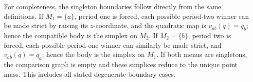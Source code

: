 For completeness, the singleton boundaries follow directly from the same definitions.  If \(M_1=\{a\}\), period one is forced, each possible period-two winner can be made strict by raising its \(z\)-coordinate, and the quadratic map is \(v_{ab}(q)=q_b\); hence the compatible body is the simplex on \(M_2\).  If \(M_2=\{b\}\), period two is forced, each possible period-one winner can similarly be made strict, and \(v_{ab}(q)=q_a\); hence the body is the simplex on \(M_1\).  If both menus are singletons, the comparison graph is empty and these simplices reduce to the unique point mass.  This includes all stated degenerate boundary cases.
